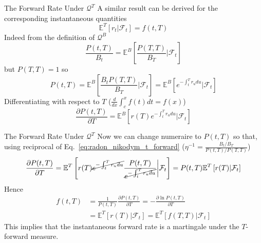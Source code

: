 \documentclass{beamer}
\begin{document}
\begin{frame}{The Forward Rate Under $\mathcal{Q}^T$}
	A similar result can be derived for the corresponding instantaneous quantities
	\begin{equation}
		\mathbb{E}^T[r_t|\mathcal{F}_t] = f(t,T)
	\end{equation}
	Indeed from the definition of $\mathcal{Q}^B$
	\begin{equation*}
		\frac{P(t,T)}{B_t}=\mathbb{E}^B\left[\frac{P(T,T)}{B_T}\bigg|\mathcal{F}_t\right]
	\end{equation*}
	but $P(T,T)=1$ so
	\begin{equation*}
	P(t,T)=\mathbb{E}^B\left[\frac{B_tP(T,T)}{B_T}\bigg|\mathcal{F}_t\right]=\mathbb{E}^B\left[e^{-\int_t^Tr_u du}\big|\mathcal{F}_t\right]
	\end{equation*}
	Differentiating with respect to $T$ ($\frac{d}{dx}\int_c^x f(t)dt=f(x)$)
	\begin{equation*}
	\frac{\partial P(t,T)}{\partial T}=
	\mathbb{E}^B\left[r(T)e^{-\int_t^Tr_u du}\big|\mathcal{F}_t\right]
	\end{equation*}
\end{frame}

\begin{frame}{The Forward Rate Under $\mathcal{Q}^T$}
	Now we can change numeraire to $P(t,T)$ so that, using reciprocal of Eq.~\ref{eq:radon_nikodym_t_forward} ($\eta^{-1}=\frac{B_t/B_T}{P(t,T)/P(T,T)}$)
	\begin{equation*}
	\frac{\partial P(t,T)}{\partial T}=
	\mathbb{E}^T\left[r(T)\cancel{e^{-\int_t^Tr_u du}}\frac{P(t,T)}{\cancel{e^{-\int_t^Tr_u du}}}\bigg|\mathcal{F}_t\right]=
	P(t,T)\mathbb{E}^T\left[r(T)|\mathcal{F}_t\right]
	\end{equation*}
	Hence
	\begin{equation*}
	\begin{aligned}
	f(t,T)&=\frac{1}{P(t,T)}\frac{\partial P(t,T)}{\partial T}=
	-\frac{\partial \ln P(t,T)}{\partial T}\\
	& = \mathbb{E}^T\left[r(T)|\mathcal{F}_t\right]=		\mathbb{E}^T\left[f(T,T)|\mathcal{F}_t\right]
	\end{aligned}
	\end{equation*}
	This implies that the instantaneous forward rate is a martingale under the $T$-forward measure.
	
\end{frame}
\end{document}
